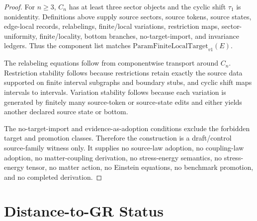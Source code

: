 \documentclass[11pt]{article}
\newcommand{\PFLFT}{\mathrm{ParamFiniteLocalTarget}_{v1}}
\begin{document}
\begin{proof}
For \(n\ge 3\), \(C_n\) has at least three sector objects and the cyclic
shift \(\tau_1\) is nonidentity. Definitions above supply source sectors,
source tokens, source states, edge-local records, relabelings, finite/local
variations, restriction maps, sector-uniformity, finite/locality, bottom
branches, no-target-import, and invariance ledgers. Thus the component list
matches \(\PFLFT(E)\).

The relabeling equations follow from componentwise transport around \(C_n\).
Restriction stability follows because restrictions retain exactly the source
data supported on finite interval subgraphs and boundary stubs, and cyclic
shift maps intervals to intervals. Variation stability follows because each
variation is generated by finitely many source-token or source-state edits and
either yields another declared source state or bottom.

The no-target-import and evidence-as-adoption conditions exclude the forbidden
target and promotion classes. Therefore the construction is a draft/control
source-family witness only. It supplies no source-law adoption, no coupling-law
adoption, no matter-coupling derivation, no stress-energy semantics, no
stress-energy tensor, no matter action, no Einstein equations, no benchmark
promotion, and no completed derivation.
\end{proof}

\section{Distance-to-GR Status}
\end{document}
